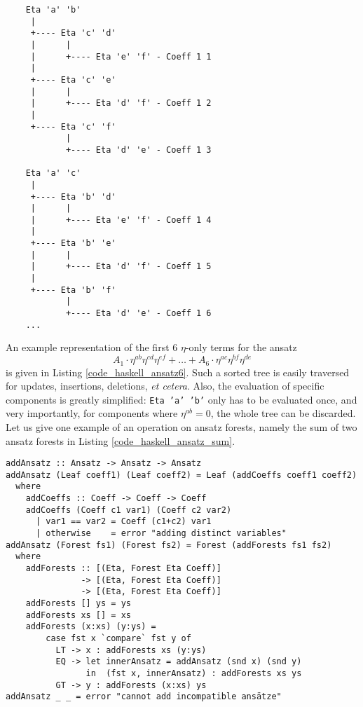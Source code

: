 \begin{code}
  \begin{verbatim}
    Eta 'a' 'b'
     |
     +---- Eta 'c' 'd'
     |      |
     |      +---- Eta 'e' 'f' - Coeff 1 1
     |
     +---- Eta 'c' 'e'
     |      |
     |      +---- Eta 'd' 'f' - Coeff 1 2
     |
     +---- Eta 'c' 'f'
            |
            +---- Eta 'd' 'e' - Coeff 1 3

    Eta 'a' 'c'
     |
     +---- Eta 'b' 'd'
     |      |
     |      +---- Eta 'e' 'f' - Coeff 1 4
     |
     +---- Eta 'b' 'e'
     |      |
     |      +---- Eta 'd' 'f' - Coeff 1 5
     |
     +---- Eta 'b' 'f'
            |
            +---- Eta 'd' 'e' - Coeff 1 6
    ...
  \end{verbatim}
  \label{code_haskell_ansatz6}
\end{code}
An example representation of the first 6 $\eta$-only terms for the ansatz
\begin{equation}
  A_1 \cdot \eta^{ab} \eta^{cd} \eta^{ef} + \dots + A_6 \cdot \eta^{ac} \eta^{bf} \eta^{de}
\end{equation}
is given in Listing \ref{code_haskell_ansatz6}. Such a sorted tree is easily traversed for updates, insertions, deletions, \emph{et cetera}. Also, the evaluation of specific components is greatly simplified: \texttt{Eta 'a' 'b'} only has to be evaluated once, and very importantly, for components where $\eta^{ab} = 0$, the whole tree can be discarded. Let us give one example of an operation on ansatz forests, namely the sum of two ansatz forests in Listing \ref{code_haskell_ansatz_sum}.
\begin{code}
  \begin{verbatim}
addAnsatz :: Ansatz -> Ansatz -> Ansatz
addAnsatz (Leaf coeff1) (Leaf coeff2) = Leaf (addCoeffs coeff1 coeff2)
  where
    addCoeffs :: Coeff -> Coeff -> Coeff
    addCoeffs (Coeff c1 var1) (Coeff c2 var2)
      | var1 == var2 = Coeff (c1+c2) var1
      | otherwise    = error "adding distinct variables"
addAnsatz (Forest fs1) (Forest fs2) = Forest (addForests fs1 fs2)
  where
    addForests :: [(Eta, Forest Eta Coeff)]
               -> [(Eta, Forest Eta Coeff)]
               -> [(Eta, Forest Eta Coeff)]
    addForests [] ys = ys
    addForests xs [] = xs
    addForests (x:xs) (y:ys) =
        case fst x `compare` fst y of
          LT -> x : addForests xs (y:ys)
          EQ -> let innerAnsatz = addAnsatz (snd x) (snd y)
                in  (fst x, innerAnsatz) : addForests xs ys
          GT -> y : addForests (x:xs) ys
addAnsatz _ _ = error "cannot add incompatible ansätze"
  \end{verbatim}
  \label{code_haskell_ansatz_sum}
\end{code}
